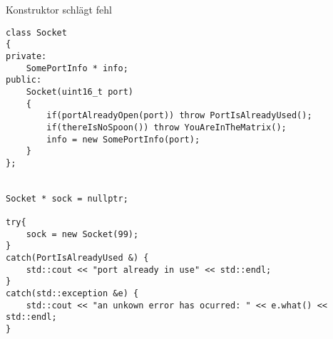 \begin{frame}[fragile]{Konstruktor schlägt fehl}
	\begin{lstlisting}[basicstyle=\tiny]
class Socket
{
private:
    SomePortInfo * info;
public:
    Socket(uint16_t port)
    {
        if(portAlreadyOpen(port)) throw PortIsAlreadyUsed();
        if(thereIsNoSpoon()) throw YouAreInTheMatrix();
        info = new SomePortInfo(port);
    }
};


Socket * sock = nullptr;

try{
    sock = new Socket(99);
}
catch(PortIsAlreadyUsed &) {
    std::cout << "port already in use" << std::endl;
}
catch(std::exception &e) {
    std::cout << "an unkown error has ocurred: " << e.what() << std::endl;
}
    \end{lstlisting}

\end{frame}
